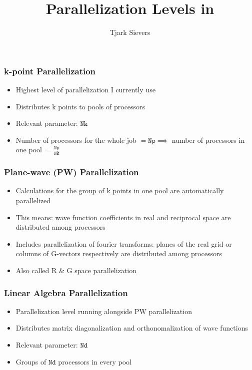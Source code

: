 \documentclass[aspectratio=169]{beamer}
\title[Parallelization Levels in \QE]{Parallelization Levels in \QE}
\author{Tjark Sievers}
\date{}
\institute[I. ITP -- AG ESoCM]{I. Institute of Theoretical Physics}
\begin{document}
{
\begin{frame}
	\titlepage
\end{frame}
}
\addtocounter{framenumber}{-1}

\begin{frame}
	\frametitle{k-point Parallelization}

	\begin{itemize}
		\item Highest level of parallelization I currently use
		\item Distributes k points to pools of processors
		\item Relevant parameter: \(\mathtt{Nk}\)
		\item Number of processors for the whole job \( = \mathtt{Np} \implies\) number of processors in one pool \(= \frac{\mathtt{Np}}{\mathtt{Nk}}\)
	\end{itemize}
\end{frame}

\begin{frame}
	\frametitle{Plane-wave (PW) Parallelization}

	\begin{itemize}
		\item Calculations for the group of k points in one pool are automatically parallelized
		\item This means: wave function coefficients in real and reciprocal space are distributed among processors
		\item Includes parallelization of fourier transforms: planes of the real grid or columns of G-vectors respectively are distributed
		among processors
		\item Also called R \& G space parallelization
	\end{itemize}
\end{frame}

\begin{frame}
	\frametitle{Linear Algebra Parallelization}

	\begin{itemize}
		\item Parallelization level running alongside PW parallelization
		\item Distributes matrix diagonalization and orthonomalization of wave functions
		\item Relevant parameter: \(\mathtt{Nd}\)
		\item Groups of \(\mathtt{Nd}\) processors in every pool
	\end{itemize}

\end{frame}
\end{document}
